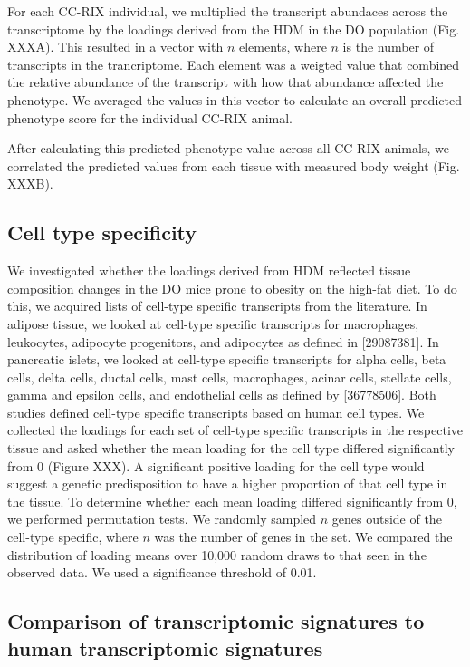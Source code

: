 \documentclass[
]{article}
\begin{document}
For each CC-RIX individual, we multiplied the transcript abundaces
across the transcriptome by the loadings derived from the HDM in the DO
population (Fig. XXXA). This resulted in a vector with \(n\) elements,
where \(n\) is the number of transcripts in the trancriptome. Each
element was a weigted value that combined the relative abundance of the
transcript with how that abundance affected the phenotype. We averaged
the values in this vector to calculate an overall predicted phenotype
score for the individual CC-RIX animal.

After calculating this predicted phenotype value across all CC-RIX
animals, we correlated the predicted values from each tissue with
measured body weight (Fig. XXXB).

\subsection{Cell type specificity}\label{cell-type-specificity}

We investigated whether the loadings derived from HDM reflected tissue
composition changes in the DO mice prone to obesity on the high-fat
diet. To do this, we acquired lists of cell-type specific transcripts
from the literature. In adipose tissue, we looked at cell-type specific
transcripts for macrophages, leukocytes, adipocyte progenitors, and
adipocytes as defined in {[}29087381{]}. In pancreatic islets, we looked
at cell-type specific transcripts for alpha cells, beta cells, delta
cells, ductal cells, mast cells, macrophages, acinar cells, stellate
cells, gamma and epsilon cells, and endothelial cells as defined by
{[}36778506{]}. Both studies defined cell-type specific transcripts
based on human cell types. We collected the loadings for each set of
cell-type specific transcripts in the respective tissue and asked
whether the mean loading for the cell type differed significantly from 0
(Figure XXX). A significant positive loading for the cell type would
suggest a genetic predisposition to have a higher proportion of that
cell type in the tissue. To determine whether each mean loading differed
significantly from 0, we performed permutation tests. We randomly
sampled \(n\) genes outside of the cell-type specific, where \(n\) was
the number of genes in the set. We compared the distribution of loading
means over 10,000 random draws to that seen in the observed data. We
used a significance threshold of 0.01.

\subsection{Comparison of transcriptomic signatures to human
transcriptomic
signatures}\label{comparison-of-transcriptomic-signatures-to-human-transcriptomic-signatures}
\end{document}
